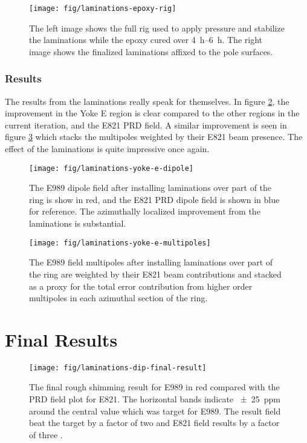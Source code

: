 \begin{figure}
\label{fig:laminations-epoxy-rig}
\texttt{[image: fig/laminations-epoxy-rig]}
\caption{The left image shows the full rig used to apply pressure and stabilize the laminations while the epoxy cured over \SIrange{4}{6}{\hour}.  The right image shows the finalized laminations affixed to the pole surfaces.}
\end{figure}

\subsubsection{Results}

The results from the laminations really speak for themselves.  In figure \ref{fig:laminations-yoke-e-dipole}, the improvement in the Yoke E region is clear compared to the other regions in the current iteration, and the E821 PRD field.  A similar improvement is seen in figure \ref{fig:laminations-yoke-e-multipoles} which stacks the multipoles weighted by their E821 beam presence.  The effect of the laminations is quite impressive once again.

\begin{figure}
\label{fig:laminations-yoke-e-dipole}
\texttt{[image: fig/laminations-yoke-e-dipole]}
\caption{The E989 dipole field after installing laminations over part of the ring is show in red, and the E821 PRD dipole field is shown in blue for reference.  The azimuthally localized improvement from the laminations is substantial.}
\end{figure}

\begin{figure}
\label{fig:laminations-yoke-e-multipoles}
\texttt{[image: fig/laminations-yoke-e-multipoles]}
\caption{The E989 field multipoles after installing laminations over part of the ring are weighted by their E821 beam contributions and stacked as a proxy for the total error contribution from higher order multipoles in each azimuthal section of the ring.}
\end{figure}

\section{Final Results}

\begin{figure}
\label{fig:laminations-dip-final-result}
\texttt{[image: fig/laminations-dip-final-result]}
\caption{The final rough shimming result for E989 in red compared with the PRD field plot for E821.  The horizontal bands indicate \SI{\pm 25}{ppm} around the central value which was target for E989.  The result field beat the target by a factor of two and E821 field results by a factor of three .}
\end{figure}
